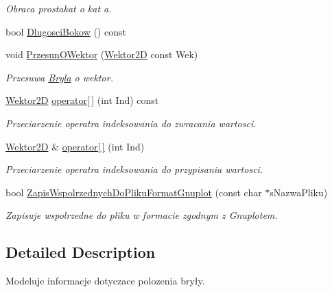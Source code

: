 \begin{DoxyCompactItemize}
\begin{DoxyCompactList}\small\item\em Obraca prostakat o kat a. \end{DoxyCompactList}\item 
bool \hyperlink{class_bryla_a0b957f6ac851edf5ebbbcb4d83c0c001}{Dlugosci\+Bokow} () const 
\item 
void \hyperlink{class_bryla_a19a72a645995fd60eaaad62006db3322}{Przesun\+O\+Wektor} (\hyperlink{class_wektor2_d}{Wektor2\+D} const Wek)
\begin{DoxyCompactList}\small\item\em Przesuwa \hyperlink{class_bryla}{Bryla} o wektor. \end{DoxyCompactList}\item 
\hypertarget{class_bryla_af6d2c85fda1a441c923760887f0137a6}{\hyperlink{class_wektor2_d}{Wektor2\+D} \hyperlink{class_bryla_af6d2c85fda1a441c923760887f0137a6}{operator\mbox{[}$\,$\mbox{]}} (int Ind) const }\label{class_bryla_af6d2c85fda1a441c923760887f0137a6}

\begin{DoxyCompactList}\small\item\em Przeciarzenie operatra indeksowania do zwracania wartosci. \end{DoxyCompactList}\item 
\hypertarget{class_bryla_ae28194f89151ebe176ad24f7dd8f5496}{\hyperlink{class_wektor2_d}{Wektor2\+D} \& \hyperlink{class_bryla_ae28194f89151ebe176ad24f7dd8f5496}{operator\mbox{[}$\,$\mbox{]}} (int Ind)}\label{class_bryla_ae28194f89151ebe176ad24f7dd8f5496}

\begin{DoxyCompactList}\small\item\em Przeciarzenie operatra indeksowania do przypisania wartosci. \end{DoxyCompactList}\item 
bool \hyperlink{class_bryla_a69540cc627492b27fc0fb7bb1848fd6a}{Zapis\+Wspolrzednych\+Do\+Pliku\+Format\+Gnuplot} (const char $\ast$s\+Nazwa\+Pliku)
\begin{DoxyCompactList}\small\item\em Zapisuje wspolrzedne do pliku w formacie zgodnym z Gnuplotem. \end{DoxyCompactList}\end{DoxyCompactItemize}


\subsection{Detailed Description}
Modeluje informacje dotyczace polozenia bryły. 

